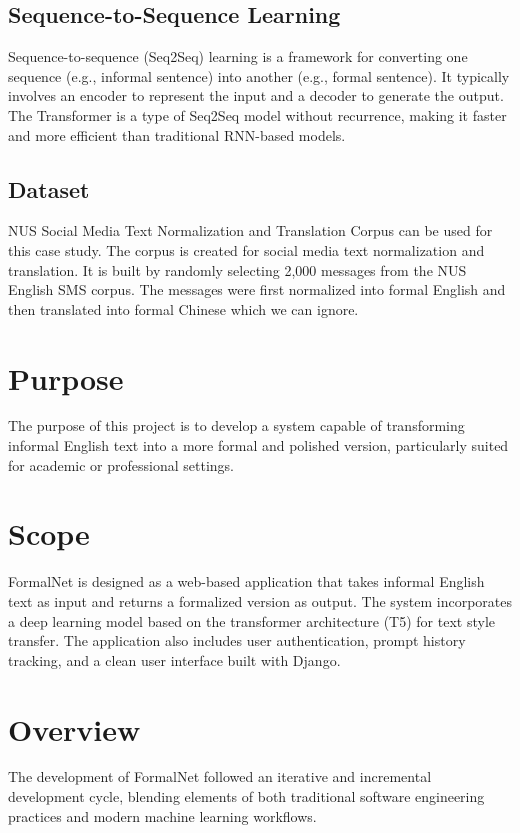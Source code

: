 \subsection{Sequence-to-Sequence Learning}
Sequence-to-sequence (Seq2Seq) learning is a framework for converting one sequence (e.g., informal sentence) into another (e.g., formal sentence). It typically involves an encoder to represent the input and a decoder to generate the output. The Transformer is a type of Seq2Seq model without recurrence, making it faster and more efficient than traditional RNN-based models.

\subsection{Dataset}
NUS Social Media Text Normalization and Translation Corpus \cite{NUS_Dataset} can be used for this case study. The corpus is created for social media text normalization and translation. It is built by randomly selecting 2,000 messages from the NUS English SMS corpus. The messages were first normalized into formal English and then translated into formal Chinese which we can ignore.


\section{Purpose}

The purpose of this project is to develop a system capable of transforming informal English text into a more formal and polished version, particularly suited for academic or professional settings. 
\section{Scope}

FormalNet is designed as a web-based application that takes informal English text as input and returns a formalized version as output. The system incorporates a deep learning model based on the transformer architecture (T5) for text style transfer. The application also includes user authentication, prompt history tracking, and a clean user interface built with Django. 

\section{Overview}

The development of FormalNet followed an iterative and incremental development cycle, blending elements of both traditional software engineering practices and modern machine learning workflows.

